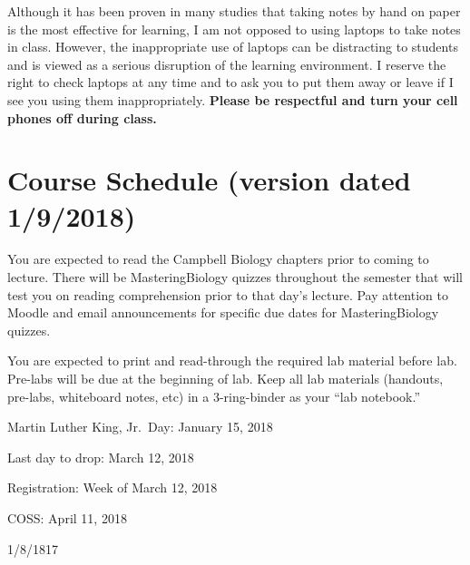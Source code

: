 \documentclass{tufte-handout}
\begin{document}
\begin{fullwidth}
Although it has been proven in many studies that taking notes by hand on paper is the most effective for learning, I am not opposed to using laptops to take notes in class. However, the inappropriate use of laptops can be distracting to students and is viewed as a serious disruption of the learning environment. I reserve the right to check laptops at any time and to ask you to put them away or leave if I see you using them inappropriately. \textbf{Please be respectful and turn your cell phones off during class.}		







\newpage
\section{Course Schedule (version dated 1/9/2018)}
%

 You are expected to read the Campbell Biology chapters prior to coming to lecture.  There will be MasteringBiology quizzes throughout the semester that will test you on reading comprehension prior to that day's lecture. Pay attention to Moodle and email announcements for specific due dates for MasteringBiology quizzes.

 You are expected to print and read-through the required lab material before lab. Pre-labs will be due at the beginning of lab. Keep all lab materials (handouts, pre-labs, whiteboard notes, etc) in a 3-ring-binder as your ``lab notebook.'' 


Martin Luther King, Jr.\ Day: January 15, 2018

Last day to drop: March 12, 2018

Registration: Week of March 12, 2018

COSS: April 11, 2018

  \setlength{\calwidth}{6.5in}
  \setlength{\calboxdepth}{0.3in}
  \begin{calendar}{1/8/18}{17}


\end{calendar}
\end{fullwidth}
\end{document}
